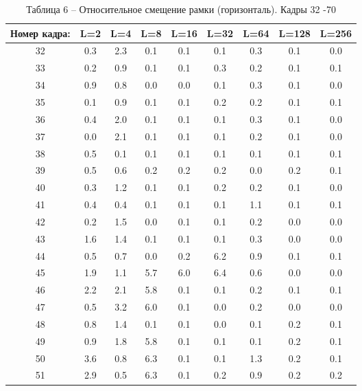 \begin{table}[h!]
\caption*{Таблица 6 -- Относительное смещение рамки (горизонталь). Кадры 32 -70 }
\begin{tabular}{|c|c|c|c|c|c|c|c|c|}
\hline
Номер кадра: & L=2 & L=4 & L=8 & L=16 & L=32 & L=64 & L=128 & L=256 \\ \hline
32           & 0.3 & 2.3 & 0.1 & 0.1  & 0.1  & 0.3  & 0.1   & 0.0   \\ \hline
33           & 0.2 & 0.9 & 0.1 & 0.1  & 0.3  & 0.2  & 0.1   & 0.1   \\ \hline
34           & 0.9 & 0.8 & 0.0 & 0.0  & 0.1  & 0.3  & 0.1   & 0.0   \\ \hline
35           & 0.1 & 0.9 & 0.1 & 0.1  & 0.2  & 0.2  & 0.1   & 0.1   \\ \hline
36           & 0.4 & 2.0 & 0.1 & 0.1  & 0.1  & 0.3  & 0.1   & 0.0   \\ \hline
37           & 0.0 & 2.1 & 0.1 & 0.1  & 0.1  & 0.2  & 0.1   & 0.0   \\ \hline
38           & 0.5 & 0.1 & 0.1 & 0.1  & 0.1  & 0.1  & 0.1   & 0.1   \\ \hline
39           & 0.5 & 0.6 & 0.2 & 0.2  & 0.2  & 0.0  & 0.2   & 0.1   \\ \hline
40           & 0.3 & 1.2 & 0.1 & 0.1  & 0.2  & 0.2  & 0.1   & 0.0   \\ \hline
41           & 0.4 & 0.4 & 0.1 & 0.1  & 0.1  & 1.1  & 0.1   & 0.1   \\ \hline
42           & 0.2 & 1.5 & 0.0 & 0.1  & 0.1  & 0.2  & 0.0   & 0.0   \\ \hline
43           & 1.6 & 1.4 & 0.1 & 0.1  & 0.1  & 0.3  & 0.0   & 0.0   \\ \hline
44           & 0.5 & 0.7 & 0.0 & 0.2  & 6.2  & 0.9  & 0.1   & 0.1   \\ \hline
45           & 1.9 & 1.1 & 5.7 & 6.0  & 6.4  & 0.6  & 0.0   & 0.0   \\ \hline
46           & 2.2 & 2.1 & 5.8 & 0.1  & 0.1  & 0.2  & 0.1   & 0.1   \\ \hline
47           & 0.5 & 3.2 & 6.0 & 0.1  & 0.0  & 0.2  & 0.0   & 0.0   \\ \hline
48           & 0.8 & 1.4 & 0.1 & 0.1  & 0.0  & 0.1  & 0.2   & 0.1   \\ \hline
49           & 0.9 & 1.8 & 5.8 & 0.1  & 0.1  & 0.1  & 0.2   & 0.1   \\ \hline
50           & 3.6 & 0.8 & 6.3 & 0.1  & 0.1  & 1.3  & 0.2   & 0.1   \\ \hline
51           & 2.9 & 0.5 & 6.3 & 0.1  & 0.2  & 0.9  & 0.2   & 0.2   \\ \hline

\end{tabular}
\end{table}
